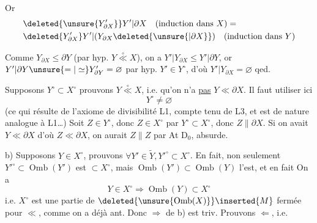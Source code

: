 

Or
\[
\begin{aligned}
&\deleted{\unsure{Y'_{\partial X}}}Y'|\partial X\quad(\text{induction dans }X)=\\
&\deleted{Y'_{\partial X}}Y'|(Y_{\partial X}\deleted{\unsure{\vert\partial X}})\quad(\text{induction dans }Y)
\end{aligned}
\]
 

Comme $Y_{\partial X}\leq\partial Y$ (par hyp. $Y\overset{\circ}{\ll}X$), on a $Y'|Y_{\partial X}\leq Y'|\partial Y$,  or $Y'|\partial Y\unsure{=|\simeq}Y'_{\partial Y}=\varnothing$ par hyp. $Y'\in Y^\circ$, d'où $Y'|Y_{\partial X}=\varnothing$ qed.

Supposons $Y^\circ\subset X^\circ$ prouvons $Y\overset{\circ}{\ll}X$, i.e. qu'on n'a \uline{pas} $Y\ll\partial X$. Il faut utiliser ici
\[
\boxed{Y^\circ\ne\varnothing}
\]
(ce qui résulte de l'axiome de divisibilité L1, compte tenu de L3, et est de nature analogue à L1\ldots) Soit $Z\in Y^\circ$, donc $Z\in X^\circ$ par $Y^\circ\subset X^\circ$, donc $Z\parallel\partial X$. Si on avait $Y\ll\partial X$ d'où $Z\ll\partial X$, on aurait $Z\parallel Z$ par At D$_0$, absurde.

b) Supposons $Y\in X^\circ$, prouvons $\forall Y'\in\widetilde Y,Y'^\circ\subset X^\circ$. En  fait, non seulement $Y'^\circ\subset\operatorname{Omb}(Y')$ est $\subset X^\circ$, mais $\operatorname{Omb}(Y')\subset\operatorname{Omb}(Y)$ l'est,  et en fait  On a
\[
Y\in X^\circ\Rightarrow\operatorname{Omb}(Y)\subset X^\circ
\]
i.e. $X^\circ$ est une partie de $\deleted{\unsure{\operatorname{Omb}(X)}}\inserted{M}$ fermée pour $\ll$, comme on a  déjà ant. Donc $\Rightarrow$ de b) est triv. Prouvons $\Leftarrow$, i.e.
